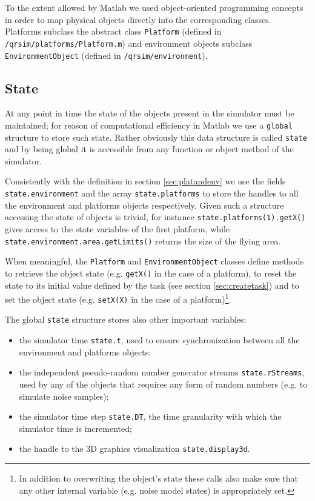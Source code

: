 \documentclass[a4paper,11pt]{report}
\begin{document}
To the extent allowed by Matlab we used object-oriented programming concepts in order to map physical objects directly into the corresponding classes. Platforms subclass the abstract class \texttt{Platform} (defined in \texttt{/qrsim/platforms/Platform.m}) and environment objects subclass \texttt{EnvironmentObject} (defined in \texttt{/qrsim/environment}).

\subsection{State}\label{sec:state}

At any point in time the state of the objects present in the simulator must be maintained; for reason of computational efficiency in Matlab we use a \texttt{global} structure to store such state. Rather obviously this data structure is called \texttt{state} and by being global it is accessible from any function or object method of the simulator.

Consistently with the definition in section \ref{sec:platandenv} we use the fields \texttt{state.environment} and the array \texttt{state.platforms} to store the handles to all the environment and platforms objects respectively. 
Given such a structure accessing the state of objects is trivial, for instance \texttt{state.platforms(1).getX()} gives access to the state variables of the first platform, while \texttt{state.environment.area.getLimits()} returns the size of the flying area. 

When meaningful, the \texttt{Platform} and \texttt{EnvironmentObject} classes define methods to retrieve the object state (e.g. \texttt{getX()} in the case of a platform), to reset the state to its initial value defined by the task (see section \ref{sec:createtask}) and to set the object state (e.g. \texttt{setX(X)} in the case of a platform)\footnote{In addition to overwriting the object's state these calls also make sure that any other internal variable (e.g. noise model states) is appropriately set.}.

The global \texttt{state} structure stores also other important variables:
\begin{itemize}
 \item the simulator time \texttt{state.t}, used to ensure synchronization between all the environment and platforms objects;
 \item the independent pseudo-random number generator streams \texttt{state.rStreams}, used by any of the objects that requires any form of random numbers (e.g. to simulate noise samples);
 \item the simulator time step \texttt{state.DT}, the time granularity with which the simulator time is incremented;
 \item the handle to the 3D graphics visualization \texttt{state.display3d}.
\end{itemize}
\end{document}
